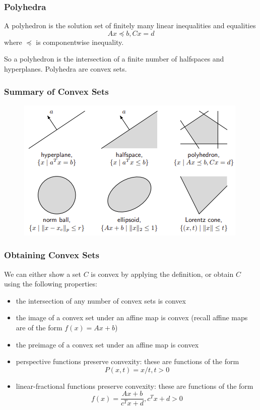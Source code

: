 \documentclass[11pt]{article}
\begin{document}
\subsubsection*{Polyhedra} 
A polyhedron is the solution set of finitely many linear inequalities and equalities 
\[ Ax \preceq b, Cx = d \] 
where $\preceq$ is componentwise inequality. \par 
So a polyhedron is the intersection of a finite number of halfspaces and hyperplanes. 
Polyhedra are convex sets. 

\subsubsection*{Summary of Convex Sets} 
\begin{figure}[H]
    \centering
    \includegraphics{images/2.1}
\end{figure}

\subsubsection*{Obtaining Convex Sets} 
We can either show a set $C$ is convex by applying the definition, or obtain $C$ using the following properties: 
\begin{itemize}
    \item the intersection of any number of convex sets is convex 
    \item the image of a convex set under an affine map is convex (recall affine maps are of the form $f(x) = Ax + b$)
    \item the preimage of a convex set under an affine map is convex
    \item perspective functions preserve convexity: these are functions of the form 
    \[ P(x, t) = x/t, t > 0 \] 
    \item linear-fractional functions preserve convexity: these are functions of the form 
    \[ f(x) = \frac{Ax + b}{c^Tx + d}, c^Tx + d > 0 \]     
\end{itemize}
\end{document}
